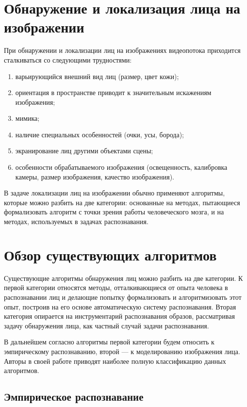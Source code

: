 \section{Обнаружение и локализация лица на изображении}
При обнаружении и локализации лиц на изображениях видеопотока приходится
сталкиваться со следующими трудностями:

\begin{enumerate}
  \item варьирующийся внешний вид лиц (размер, цвет кожи);
  \item ориентация в пространстве приводит к значительным искажениям
изображения;
  \item мимика;
  \item наличие специальных особенностей (очки, усы, борода);
  \item экранирование лиц другими объектами сцены;
  \item особенности обрабатываемого изображения (освещенность, калибровка
камеры, размер изображения, качество изображения).
\end{enumerate}

В задаче локализации лиц на изображении обычно применяют алгоритмы, которые
можно разбить на две категории: основанные на методах, пытающиеся формализовать
алгоритм с точки зрения работы человеческого мозга, и на методах, используемых
в задачах распознавания.

\section{Обзор существующих алгоритмов}

Существующие алгоритмы обнаружения лиц можно разбить на две категории. К
первой категории относятся методы, отталкивающиеся от опыта человека в
распознавании лиц и делающие попытку формализовать и алгоритмизовать этот опыт,
построив на его основе автоматическую систему распознавания. Вторая категория
опирается на инструментарий распознавания образов, рассматривая задачу
обнаружения лица, как частный случай задачи распознавания. 

В дальнейшем согласно \cite{Veznevec_Degtyareva} алгоритмы первой категории
будем относить к эмпирическому распознаванию, второй --- к моделированию
изображения лица. Авторы \cite{Veznevec_Degtyareva} в своей работе приводят
наиболее полную классификацию данных алгоритмов.

\subsection{Эмпирическое распознавание}

